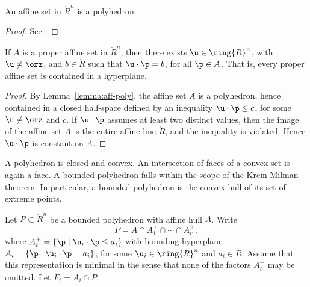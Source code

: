 \begin{lemma}[]\label{lemma:aff-poly}
An affine set in $\ring{R}^n$ is a polyhedron.
\end{lemma}

\begin{proof} See \cite[Cor~1.4.2]{webster:1994}.
\end{proof}

\begin{lemma}[]\label{lemma:aff-u}
If $A$ is a proper affine set in $\ring{R}^n$, then there exists $\u\in \ring{R}^n$, with
$\u\ne\orz$, and $b\in\ring{R}$ 
such that $\u\cdot\p = b$, for all $\p\in A$.  That is, every proper affine set
is contained in a hyperplane.
\end{lemma}

\begin{proof}
By Lemma~\ref{lemma:aff-poly},
the affine set $A$ is a polyhedron, hence contained in a closed half-space defined by an
inequality $\u\cdot\p \le c$, for some $\u\ne \orz$ and $c$.  If $\u\cdot\p$ assumes
at least two distinct values, then the image of the affine set $A$ 
is the entire affine line $\ring{R}$, and the inequality is violated.
Hence $\u\cdot\p$ is constant on $A$.
\end{proof}

A polyhedron is closed and convex.  An intersection of faces of a
convex set is again a face.  A bounded polyhedron falls within the
scope of the Krein-Milman theorem.  In particular, a bounded
polyhedron is the convex hull of its set of extreme points.
%

Let $P\subset\ring{R}^n$ be a bounded polyhedron with affine hull
$A$. Write
\begin{equation}\label{eqn:polyrep}
P = A \cap A^+_1 \cap \cdots \cap A^+_r,
\end{equation}
where $A^+_i = \{\p\mid \u_i\cdot \p \le a_i\}$ with bounding
hyperplane $A_i=\{\p\mid \u_i \cdot \p = a_i\}$, for some $\u_i\in
\ring{R}^n$ and $a_i\in\ring{R}$.  Assume that this representation is
minimal in the sense that none of the factors $A^+_i$ may be omitted.
Let $F_i = A_i\cap P$.  %



